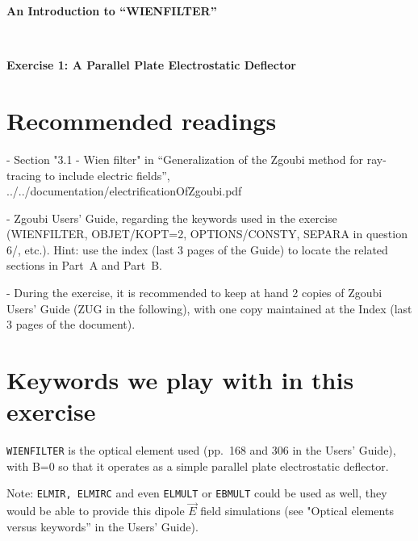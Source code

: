 
\thispagestyle{empty}

\begin{minipage}{1.\linewidth}
\bf
\vspace{-2ex}
  
\vspace{-2ex}
  
\vspace{-2ex}
  
\end{minipage}


\vspace{5ex}

\centerline{\LARGE \bf
  An Introduction to  ``WIENFILTER'' 
}

~

\centerline{\LARGE \bf
Exercise 1: A Parallel Plate Electrostatic Deflector
}


\section*{Recommended readings}

\nin - Section  "3.1 - Wien filter"  in 
``Generalization of the Zgoubi method for ray-tracing to include electric fields'', \\
../../documentation/electrificationOfZgoubi.pdf

\smallskip
\nin - Zgoubi Users' Guide, regarding the keywords used in the exercise (WIENFILTER, OBJET/KOPT=2, OPTIONS/CONSTY, SEPARA in question 6/, etc.). Hint: use the index (last 3 pages of the Guide) to locate the related sections in Part~A and Part~B. 


\smallskip
\nin - During the exercise, it is recommended to keep at hand 2 copies of Zgoubi Users' Guide (ZUG in the following),
with one copy maintained  at the Index (last 3 pages of the document).


\section*{Keywords we play with in this exercise}

\texttt{WIENFILTER} is the optical element used  (pp.~168 and 306 in the Users' Guide), with B=0  so that it operates as a simple parallel plate electrostatic deflector.

\nin Note: \texttt{ELMIR, ELMIRC} and even \texttt{ELMULT} or \texttt{EBMULT}  could be used as well, they would be able to provide this dipole $ \vec E$ field simulations (see "Optical elements versus keywords'' in the Users' Guide).


